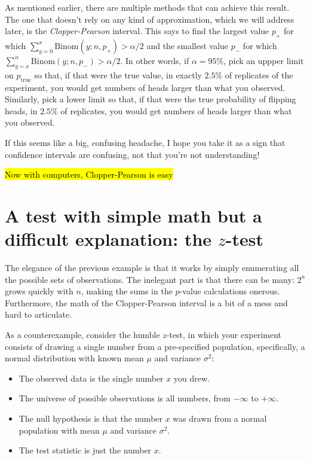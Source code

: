 As mentioned earlier, there are multiple methods that can achieve this result.
The one that doesn't rely on any kind of approximation, which we will address
later, is the \emph{Clopper-Pearson} interval. This says to find the largest
value $p_+$ for which $\sum_{y=0}^x \mathrm{Binom}(y; n, p_+) > \alpha/2$ and
the smallest value $p_-$ for which $\sum_{y=x}^n \mathrm{Binom}(y; n, p_-) >
\alpha/2$. In other words, if $\alpha=95\%$, pick an uppper limit on
$p_\mathrm{true}$ so that, if that were the true value, in exactly $2.5\%$ of
replicates of the experiment, you would get numbers of heads larger than what
you observed. Similarly, pick a lower limit so that, if that were the true
probability of flipping heads, in $2.5\%$ of replicates, you would get numbers
of heads larger than what you observed.

If this seems like a big, confusing headache, I hope you take it as a sign that
confidence intervals are confusing, not that you're not understanding!

\hl{Now with computers, Clopper-Pearson is easy}

\section{A test with simple math but a difficult explanation: the $z$-test}

The elegance of the previous example is that it works by simply enumerating all
the possible sets of observations. The inelegant part is that there can be
many: $2^n$ grows quickly with $n$, making the sums in the $p$-value
calculations onerous. Furthermore, the math of the Clopper-Pearson interval is
a bit of a mess and hard to articulate.

As a counterexample, consider the humble $z$-test, in which your experiment consists of drawing a single number from a pre-specified population, specifically, a normal distribution with known mean $\mu$ and variance $\sigma^2$:
\begin{itemize}
\item The observed data is the single number $x$ you drew.
\item The universe of possible observations is all numbers, from $-\infty$ to $+\infty$.
\item The null hypothesis is that the number $x$ was drawn from a normal population with mean $\mu$ and variance $\sigma^2$.
\item The test statistic is just the number $x$.
\end{itemize}

